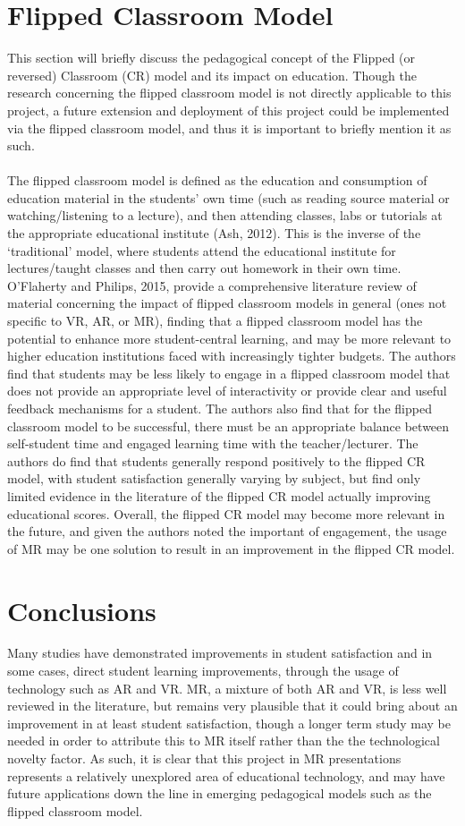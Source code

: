 \documentclass[11pt]{report}
\begin{document}
\section{Flipped Classroom Model}
This section will briefly discuss the pedagogical concept of the Flipped (or reversed) Classroom (CR) model and its impact on education. Though the research concerning the flipped classroom model is not directly applicable to this project, a future extension and deployment of this project could be implemented via the flipped classroom model, and thus it is important to briefly mention it as such.\\~\\
The flipped classroom model is defined as the education and consumption of education material in the students' own time (such as reading source material or watching/listening to a lecture), and then attending classes, labs or tutorials at the appropriate educational institute (Ash, 2012). This is the inverse of the `traditional' model, where students attend the educational institute for lectures/taught classes and then carry out homework in their own time. O'Flaherty and Philips, 2015, provide a comprehensive literature review of material concerning the impact of flipped classroom models in general (ones not specific to VR, AR, or MR), finding that a flipped classroom model has the potential to enhance more student-central learning, and may be more relevant to higher education institutions faced with increasingly tighter budgets. The authors find that students may be less likely to engage in a flipped classroom model that does not provide an appropriate level of interactivity or provide clear and useful feedback mechanisms for a student. The authors also find that for the flipped classroom model to be successful, there must be an appropriate balance between self-student time and engaged learning time with the teacher/lecturer. The authors do find that students generally respond positively to the flipped CR model, with student satisfaction generally varying by subject, but find only limited evidence in the literature of the flipped CR model actually improving educational scores. Overall, the flipped CR model may become more relevant in the future, and given the authors noted the important of engagement, the usage of MR may be one solution to result in an improvement in the flipped CR model.
\section{Conclusions}
Many studies have demonstrated improvements in student satisfaction and in some cases, direct student learning improvements, through the usage of technology such as AR and VR. MR, a mixture of both AR and VR, is less well reviewed in the literature, but remains very plausible that it could bring about an improvement in at least student satisfaction, though a longer term study may be needed in order to attribute this to MR itself rather than the the technological novelty factor. As such, it is clear that this project in MR presentations represents a relatively unexplored area of educational technology, and may have future applications down the line in emerging pedagogical models such as the flipped classroom model.
\end{document}
